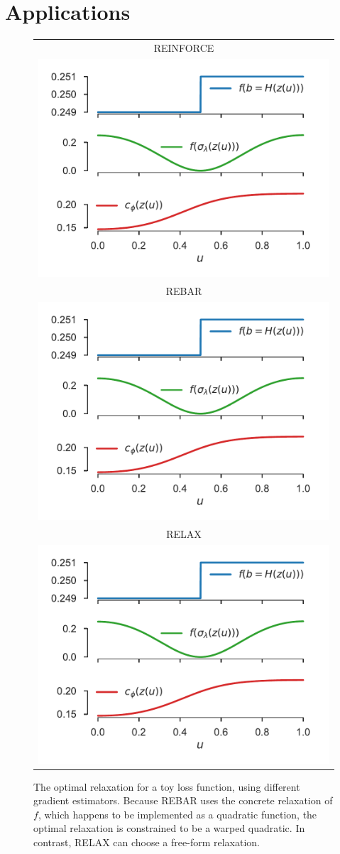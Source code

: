 \documentclass{article}
\newcommand{\E}{\mathbb{E}}
\begin{document}
\section{Applications}
\label{Applications}
%
\begin{figure}
\centering
\vspace{-10mm}
\begin{tabular}{c}
REINFORCE\\
\hspace{-3mm}\includegraphics[width=0.50\columnwidth, clip, trim=0.5cm 8cm 0.8cm 0.5cm]{figures/relaxations_t_499_which_2}\\
REBAR\\
\hspace{-3mm}\includegraphics[width=0.50\columnwidth, clip, trim=0.5cm 5cm 0.8cm 3.9cm]{figures/relaxations_t_499_which_2}\\
RELAX\\
\hspace{-3mm}\includegraphics[width=0.50\columnwidth, clip, trim=0.5cm 0cm 0.8cm 7.2cm]{figures/relaxations_t_499_which_2}
\end{tabular}
\vspace*{-6mm}
\caption{The optimal relaxation for a toy loss function, using different gradient estimators.
Because REBAR uses the concrete relaxation of $f$, which happens to be implemented as a quadratic function, the optimal relaxation is constrained to be a warped quadratic.
In contrast, RELAX can choose a free-form relaxation.}
\label{learned-relaxations}
\end{figure}
\end{document}

